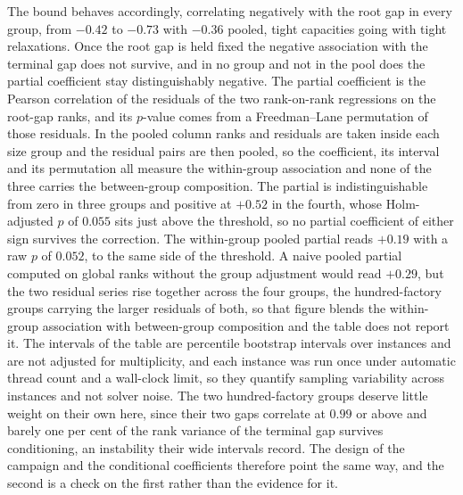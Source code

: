 The bound behaves accordingly, correlating negatively with the root
gap in every group, from $-0.42$ to $-0.73$ with $-0.36$ pooled, tight
capacities going with tight relaxations. Once the root gap is held
fixed the negative association with the terminal gap does not survive,
and in no group and not in the pool does the partial coefficient
stay distinguishably negative. The partial coefficient is the Pearson
correlation of the residuals of the two rank-on-rank regressions on
the root-gap ranks, and its $p$-value comes from a Freedman--Lane
permutation of those residuals. In the pooled column ranks and
residuals are taken inside each size group and the residual pairs are
then pooled, so the coefficient, its interval and its permutation all
measure the within-group association and none of the three carries the
between-group composition. The partial is indistinguishable from zero
in three groups and positive at $+0.52$ in the fourth, whose
Holm-adjusted $p$ of $0.055$ sits just above the threshold, so no
partial coefficient of either sign survives the correction.
The within-group pooled partial reads $+0.19$ with a raw $p$ of
$0.052$, to the same side of the threshold. A naive pooled partial
computed on global ranks without the group adjustment would read
$+0.29$, but the two
residual series rise together across the four groups, the
hundred-factory groups carrying the larger residuals of both, so that
figure blends the within-group association with between-group
composition and the table does not report it. The intervals of the table are percentile
bootstrap intervals over instances and are not adjusted for
multiplicity, and each instance was run once under automatic thread
count and a wall-clock limit, so they quantify sampling variability
across instances and not solver noise. The two hundred-factory groups
deserve little
weight on their own here, since their two gaps correlate at $0.99$ or
above and barely one per cent of the rank variance of the terminal gap
survives conditioning, an instability their wide intervals record. The
design of the campaign and the conditional coefficients therefore
point the
same way, and the second is a check on the first rather than the
evidence for it.

